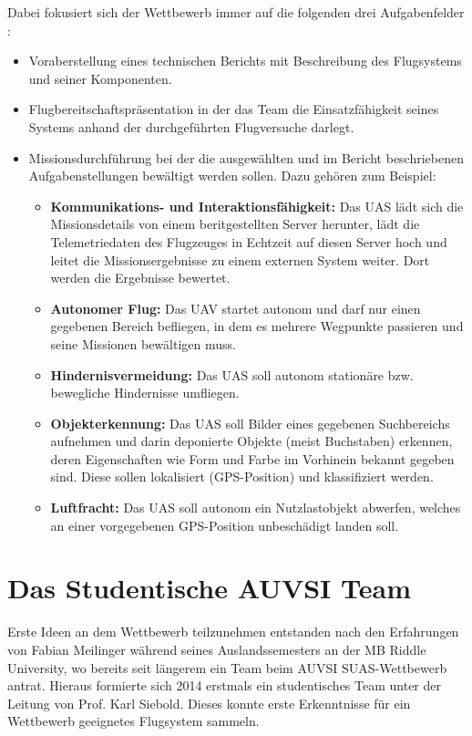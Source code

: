 Dabei fokusiert sich der Wettbewerb immer auf die folgenden drei Aufgabenfelder \cite{AUVSIrules}:
\begin{itemize}
\item Voraberstellung eines technischen Berichts mit Beschreibung des Flugsystems und seiner Komponenten.
\item Flugbereitschaftspräsentation in der das Team die Einsatzfähigkeit seines Systems anhand der durchgeführten Flugversuche darlegt. 
\item Missionsdurchführung bei der die ausgewählten und im Bericht beschriebenen Aufgabenstellungen bewältigt werden sollen. Dazu gehören zum Beispiel:

\begin{itemize}

\item \textbf{Kommunikations- und Interaktionsfähigkeit:} Das UAS lädt sich die Missionsdetails von einem beritgestellten Server herunter, lädt die Telemetriedaten des Flugzeuges in Echtzeit auf diesen Server hoch und leitet die Missionsergebnisse zu einem externen System weiter. Dort werden die Ergebnisse bewertet.

\item \textbf{Autonomer Flug:} Das UAV startet autonom und darf nur einen gegebenen Bereich befliegen, in dem es mehrere Wegpunkte passieren und seine Missionen bewältigen muss.

\item \textbf{Hindernisvermeidung:} Das UAS soll autonom stationäre bzw. bewegliche Hindernisse umfliegen.

\item \textbf{Objekterkennung:} Das UAS soll Bilder eines gegebenen Suchbereichs aufnehmen und darin deponierte Objekte (meist Buchstaben) erkennen, deren Eigenschaften wie Form und Farbe im Vorhinein bekannt gegeben sind. Diese sollen lokalisiert (GPS-Position) und klassifiziert werden.

\item \textbf{Luftfracht:} Das UAS soll autonom ein Nutzlastobjekt abwerfen, welches an einer vorgegebenen GPS-Position unbeschädigt landen soll.

\end{itemize}

\end{itemize}



\section{Das Studentische AUVSI Team}
Erste Ideen an dem Wettbewerb teilzunehmen entstanden nach den Erfahrungen von Fabian Meilinger während seines Auslandssemesters an der MB Riddle University, wo bereits seit längerem ein Team beim AUVSI SUAS-Wettbewerb antrat. 
Hieraus formierte sich 2014 erstmals ein studentisches Team unter der Leitung von Prof. Karl Siebold. Dieses konnte erste Erkenntnisse für ein Wettbewerb geeignetes Flugsystem sammeln. 

